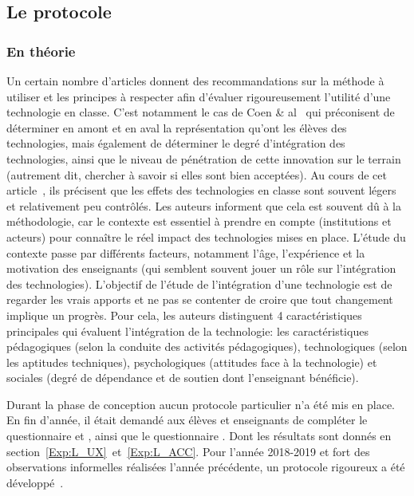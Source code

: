   \subsection{Le protocole}\label{sec:proto}
    \subsubsection{En théorie}
        Un certain nombre d’articles donnent des recommandations sur la méthode à utiliser et les principes à respecter afin d’évaluer rigoureusement l’utilité d’une technologie en classe. C’est notamment le cas de Coen \& al~ qui préconisent de déterminer en amont et en aval la représentation qu’ont les élèves des technologies, mais également de déterminer le degré d'intégration des technologies, ainsi que le niveau de pénétration de cette innovation sur le terrain (autrement dit, chercher à savoir si elles sont bien acceptées).
        Au cours de cet article~, ils précisent que les effets des technologies en classe sont souvent légers et relativement peu contrôlés. Les auteurs informent que cela est souvent dû à la méthodologie, car le contexte est essentiel à prendre en compte (institutions et acteurs) pour connaître le réel impact des technologies mises en place. L’étude du contexte passe par différents facteurs, notamment l’âge, l'expérience et la motivation des enseignants (qui semblent souvent jouer un rôle sur l'intégration des technologies). L’objectif de l’étude de l’intégration d’une technologie est de regarder les vrais apports et ne pas se contenter de croire que tout changement implique un progrès. Pour cela, les auteurs distinguent 4 caractéristiques principales qui évaluent l’intégration de la technologie: les caractéristiques \Li pédagogiques (selon la conduite des activités pédagogiques), \ii technologiques (selon les aptitudes techniques), \iii psychologiques (attitudes face à la technologie) et \iiii sociales (degré de dépendance et de soutien dont l’enseignant bénéficie).\par%
        Durant la phase de conception aucun protocole particulier n'a été mis en place.
        En fin d'année, il était demandé aux élèves et enseignants de compléter le questionnaire  et , ainsi que le questionnaire . Dont les résultats sont donnés en section~\ref{Exp:L_UX}~et~\ref{Exp:L_ACC}. Pour l'année 2018-2019 et fort des observations informelles réalisées l'année précédente, un protocole rigoureux a été développé~.
